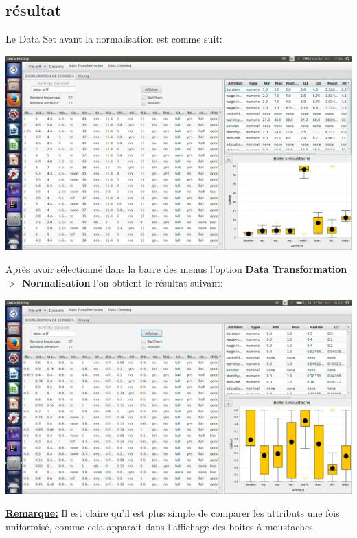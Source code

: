 \documentclass[12pt,a4paper,oneside]{book}
\begin{document}
\subsection{résultat}
Le Data Set avant la normalisation est comme suit: 
\begin{center}
	\includegraphics[width=1\textwidth]{screens/avantDiscr.png}%
	\label{labelname}%
\end{center}

Après avoir sélectionné dans la barre des menus l'option \textbf{Data Transformation $>$ Normalisation} l'on obtient le résultat suivant:

\begin{center}
	\includegraphics[width=1\textwidth]{screens/apresNormal.png}%
	\label{labelname}%
\end{center}

\underline{\textbf{Remarque:}}
Il est claire qu'il est plus simple de comparer les attributs une fois uniformisé, comme cela apparait dans l'affichage des boites à moustaches.
\end{document}

